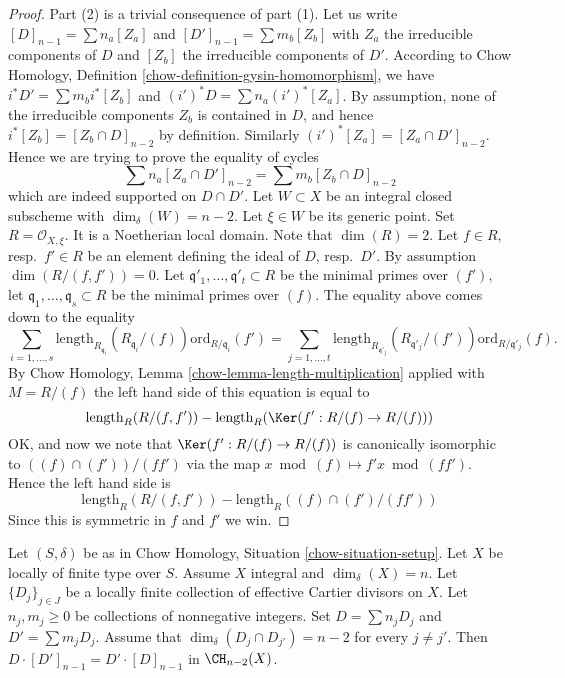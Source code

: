 \begin{proof}
Part (2) is a trivial consequence of part (1).
Let us write $[D]_{n - 1} = \sum n_a[Z_a]$ and
$[D']_{n - 1} = \sum m_b[Z_b]$ with $Z_a$ the irreducible
components of $D$ and $[Z_b]$ the irreducible
components of $D'$. According to
Chow Homology, Definition \ref{chow-definition-gysin-homomorphism},
we have $i^*D' = \sum m_b i^*[Z_b]$ and $(i')^*D = \sum n_a(i')^*[Z_a]$.
By assumption, none of the irreducible components $Z_b$
is contained in $D$, and hence $i^*[Z_b] = [Z_b\cap D]_{n - 2}$
by definition. Similarly $(i')^*[Z_a] = [Z_a \cap D']_{n - 2}$.
Hence we are trying to prove the equality of cycles
$$
\sum n_a[Z_a \cap D']_{n - 2} = \sum m_b[Z_b \cap D]_{n - 2}
$$
which are indeed supported on $D \cap D'$.
Let $W \subset X$ be an integral closed subscheme
with $\dim_\delta(W) = n - 2$. Let $\xi \in W$ be its generic point.
Set $R = \mathcal{O}_{X, \xi}$. It is a Noetherian local domain.
Note that $\dim(R) = 2$. Let $f \in R$, resp.\ $f' \in R$
be an element defining the ideal of $D$, resp.\ $D'$.
By assumption $\dim(R/(f, f')) = 0$. Let
$\mathfrak q'_1, \ldots, \mathfrak q'_t \subset R$ be the minimal
primes over $(f')$, let $\mathfrak q_1, \ldots, \mathfrak q_s \subset R$
be the minimal primes over $(f)$.
The equality above comes down to the equality
$$
\sum_{i = 1, \ldots, s}
\text{length}_{R_{\mathfrak q_i}}(R_{\mathfrak q_i}/(f))
\text{ord}_{R/\mathfrak q_i}(f')
=
\sum_{j = 1, \ldots, t}
\text{length}_{R_{\mathfrak q'_j}}(R_{\mathfrak q'_j}/(f'))
\text{ord}_{R/\mathfrak q'_j}(f).
$$
By Chow Homology, Lemma \ref{chow-lemma-length-multiplication} 
applied with $M = R/(f)$ the left hand side of
this equation is equal to
$$
\text{length}_R(R/(f, f'))
-
\text{length}_R(\Ker(f' : R/(f) \to R/(f)))
$$
OK, and now we note that
$\Ker(f' : R/(f) \to R/(f))$ is canonically isomorphic
to $((f) \cap (f'))/(ff')$ via the map $x \bmod (f) \mapsto
f'x \bmod (ff')$. Hence the left hand side is
$$
\text{length}_R(R/(f, f'))
-
\text{length}_R((f) \cap (f')/(ff'))
$$
Since this is symmetric in $f$ and $f'$ we win.
\end{proof}

\begin{lemma}
\label{lemma-commutativity-effective-Cartier-proper-intersection-infinite}
Let $(S, \delta)$ be as in Chow Homology, Situation \ref{chow-situation-setup}.
Let $X$ be locally of finite type over $S$.
Assume $X$ integral and $\dim_\delta(X) = n$.
Let $\{D_j\}_{j \in J}$ be a locally finite collection of
effective Cartier divisors on $X$. Let $n_j, m_j \geq 0$ be
collections of nonnegative integers. Set
$D = \sum n_j D_j$ and $D' = \sum m_j D_j$.
Assume that $\dim_\delta(D_j \cap D_{j'}) = n - 2$ for every
$j \not = j'$. Then $D \cdot [D']_{n - 1} = D' \cdot [D]_{n - 1}$ in
$\CH_{n - 2}(X)$.
\end{lemma}

